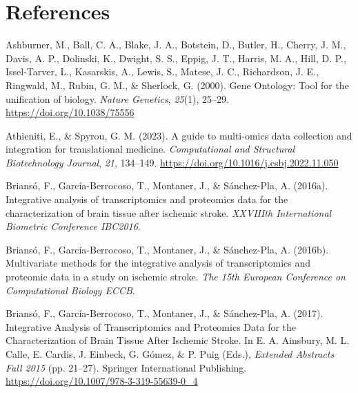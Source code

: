 \documentclass[a4paper, nobind]{templates/ociamthesis}
\newlength{\cslhangindent}
\newenvironment{CSLReferences}[2] %
 {%
  \setlength{\parindent}{0pt}
  \ifodd #1
  \let\oldpar\par
  \def\par{\hangindent=\cslhangindent\oldpar}
  \fi
  \setlength{\parskip}{1mm}
  \setlength{\baselineskip}{6mm}
 }%
 {}
\begin{document}
\hypertarget{references}{%
\chapter*{References}\label{references}}


\hypertarget{refs}{}
\begin{CSLReferences}{1}{0}
\leavevmode{}%
Ashburner, M., Ball, C. A., Blake, J. A., Botstein, D., Butler, H., Cherry, J. M., Davis, A. P., Dolinski, K., Dwight, S. S., Eppig, J. T., Harris, M. A., Hill, D. P., Issel-Tarver, L., Kasarskis, A., Lewis, S., Matese, J. C., Richardson, J. E., Ringwald, M., Rubin, G. M., \& Sherlock, G. (2000). Gene {Ontology}: Tool for the unification of biology. \emph{Nature Genetics}, \emph{25}(1), 25--29. \url{https://doi.org/10.1038/75556}

\leavevmode{}%
Athieniti, E., \& Spyrou, G. M. (2023). A guide to multi-omics data collection and integration for translational medicine. \emph{Computational and Structural Biotechnology Journal}, \emph{21}, 134--149. \url{https://doi.org/10.1016/j.csbj.2022.11.050}

\leavevmode{}%
Briansó, F., García-Berrocoso, T., Montaner, J., \& Sánchez-Pla, A. (2016a). Integrative analysis of transcriptomics and proteomics data for the characterization of brain tissue after ischemic stroke. \emph{XXVIIIth International Biometric Conference IBC2016}.

\leavevmode{}%
Briansó, F., García-Berrocoso, T., Montaner, J., \& Sánchez-Pla, A. (2016b). Multivariate methods for the integrative analysis of transcriptomics and proteomic data in a study on ischemic stroke. \emph{The 15th European Conference on Computational Biology ECCB}.

\leavevmode{}%
Briansó, F., García-Berrocoso, T., Montaner, J., \& Sánchez-Pla, A. (2017). Integrative {Analysis} of {Transcriptomics} and {Proteomics} {Data} for the {Characterization} of {Brain} {Tissue} {After} {Ischemic} {Stroke}. In E. A. Ainsbury, M. L. Calle, E. Cardis, J. Einbeck, G. Gómez, \& P. Puig (Eds.), \emph{Extended {Abstracts} {Fall} 2015} (pp. 21--27). Springer International Publishing. \url{https://doi.org/10.1007/978-3-319-55639-0_4}


\end{CSLReferences}
\end{document}
